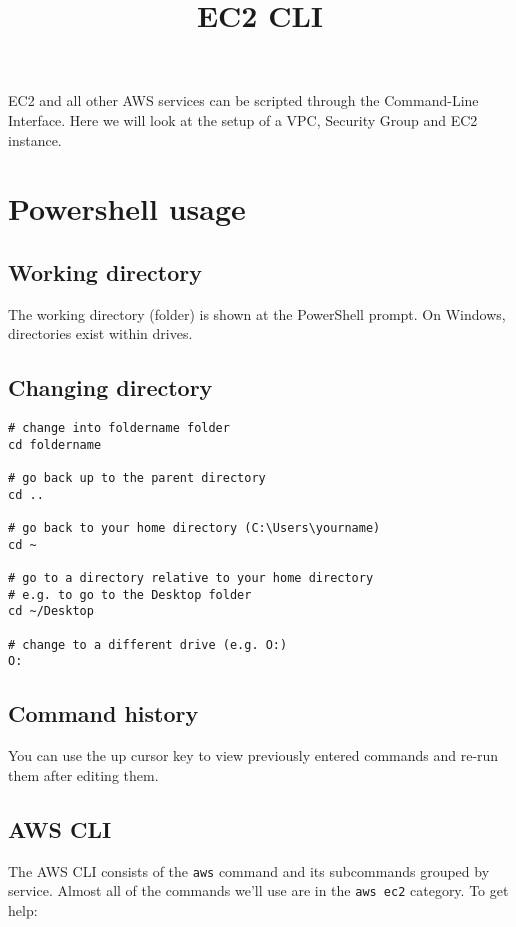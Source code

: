 \documentclass{pgnotes}
\title{EC2 CLI}
\begin{document}
\maketitle

EC2 and all other AWS services can be scripted through the Command-Line Interface.
Here we will look at the setup of a VPC, Security Group and EC2 instance.

\section{Powershell usage}

\subsection{Working directory}

The working directory (folder) is shown at the PowerShell prompt.
On Windows, directories exist within drives. 

\subsection{Changing directory}

\begin{verbatim}
# change into foldername folder
cd foldername

# go back up to the parent directory
cd ..

# go back to your home directory (C:\Users\yourname)
cd ~

# go to a directory relative to your home directory
# e.g. to go to the Desktop folder
cd ~/Desktop

# change to a different drive (e.g. O:)
O: 
\end{verbatim}

\subsection{Command history}

You can use the up cursor key to view previously entered commands and re-run them after editing them.

\subsection{AWS CLI}

The AWS CLI consists of the \texttt{aws} command and its subcommands grouped by service. 
Almost all of the commands we'll use are in the \texttt{aws ec2} category.
To get help:
\end{document}
